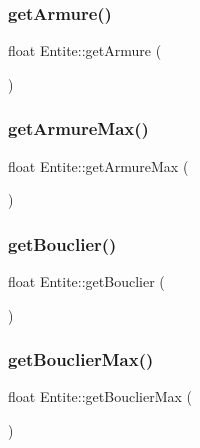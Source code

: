 \subsubsection{\texorpdfstring{get\+Armure()}{getArmure()}}
{\footnotesize\ttfamily float Entite\+::get\+Armure (\begin{DoxyParamCaption}{ }\end{DoxyParamCaption})\hspace{0.3cm}{\ttfamily [inline]}}

\mbox{\label{class_entite_a8c7e378e1fb1567d4320647ea1cdfa83}} 
\subsubsection{\texorpdfstring{get\+Armure\+Max()}{getArmureMax()}}
{\footnotesize\ttfamily float Entite\+::get\+Armure\+Max (\begin{DoxyParamCaption}{ }\end{DoxyParamCaption})\hspace{0.3cm}{\ttfamily [inline]}}

\mbox{\label{class_entite_a9f5f0e61edacb8d16ab5a8e65fc987a8}} 
\subsubsection{\texorpdfstring{get\+Bouclier()}{getBouclier()}}
{\footnotesize\ttfamily float Entite\+::get\+Bouclier (\begin{DoxyParamCaption}{ }\end{DoxyParamCaption})\hspace{0.3cm}{\ttfamily [inline]}}

\mbox{\label{class_entite_a31d930fa852c6254f300927b86dfcf57}} 
\subsubsection{\texorpdfstring{get\+Bouclier\+Max()}{getBouclierMax()}}
{\footnotesize\ttfamily float Entite\+::get\+Bouclier\+Max (\begin{DoxyParamCaption}{ }\end{DoxyParamCaption})\hspace{0.3cm}{\ttfamily [inline]}}

